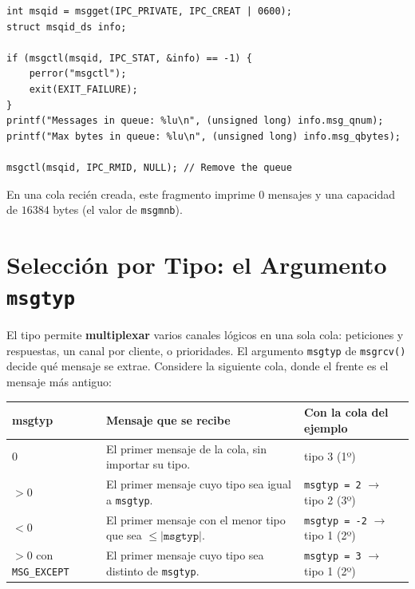 \documentclass[12pt,a4paper]{article}
\begin{document}
\begin{lstlisting}
int msqid = msgget(IPC_PRIVATE, IPC_CREAT | 0600);
struct msqid_ds info;

if (msgctl(msqid, IPC_STAT, &info) == -1) {
    perror("msgctl");
    exit(EXIT_FAILURE);
}
printf("Messages in queue: %lu\n", (unsigned long) info.msg_qnum);
printf("Max bytes in queue: %lu\n", (unsigned long) info.msg_qbytes);

msgctl(msqid, IPC_RMID, NULL); // Remove the queue
\end{lstlisting}

En una cola recién creada, este fragmento imprime $0$ mensajes y una capacidad de $16384$ bytes (el valor de \texttt{msgmnb}).

\newpage

\section{Selección por Tipo: el Argumento \texttt{msgtyp}}
El tipo permite \textbf{multiplexar} varios canales lógicos en una sola cola: peticiones y respuestas, un canal por cliente, o prioridades. El argumento \texttt{msgtyp} de \texttt{msgrcv()} decide qué mensaje se extrae. Considere la siguiente cola, donde el frente es el mensaje más antiguo:

\begin{center}
\end{center}

\begin{table}[h]
\centering
\small
\begin{tabular}{|l|p{6.2cm}|l|}
\hline
\textbf{msgtyp} & \textbf{Mensaje que se recibe} & \textbf{Con la cola del ejemplo} \\ \hline
$0$ & El primer mensaje de la cola, sin importar su tipo. & tipo 3 (1º) \\ \hline
$> 0$ & El primer mensaje cuyo tipo sea igual a \texttt{msgtyp}. & \texttt{msgtyp = 2} $\to$ tipo 2 (3º) \\ \hline
$< 0$ & El primer mensaje con el menor tipo que sea $\leq |\texttt{msgtyp}|$. & \texttt{msgtyp = -2} $\to$ tipo 1 (2º) \\ \hline
$> 0$ con \texttt{MSG\_EXCEPT} & El primer mensaje cuyo tipo sea distinto de \texttt{msgtyp}. & \texttt{msgtyp = 3} $\to$ tipo 1 (2º) \\ \hline
\end{tabular}
\end{table}
\end{document}
